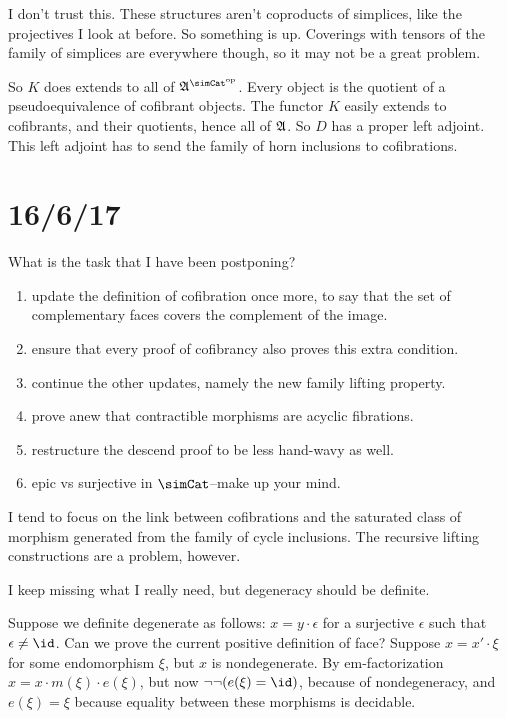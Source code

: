 \documentclass[csh.tex]{subfiles}
\begin{document}
I don't trust this. These structures aren't coproducts of simplices, like the projectives I look at before. So something is up.
Coverings with tensors of the family of simplices are everywhere though, so it may not be a great problem.

So $K$ does extends to all of $\ambient\s$. Every object is the quotient of a pseudoequivalence of cofibrant objects. The functor $K$ easily extends to cofibrants, and their quotients, hence all of $\mathfrak A$. So $D$ has a proper left adjoint. This left adjoint has to send the family of horn inclusions to cofibrations.



\section{16/6/17}
What is the task that I have been postponing?
\begin{enumerate}
\item update the definition of cofibration once more, to say that the set of complementary faces covers the complement of the image.
\item ensure that every proof of cofibrancy also proves this extra condition.
\item continue the other updates, namely the new family lifting property.
\item prove anew that contractible morphisms are acyclic fibrations.
\item restructure the descend proof to be less hand-wavy as well.
\item epic vs surjective in $\simCat$--make up your mind.
\end{enumerate}

I tend to focus on the link between cofibrations and the saturated class of morphism generated from the family of cycle inclusions.
The recursive lifting constructions are a problem, however.

I keep missing what I really need, but degeneracy should be definite.

Suppose we definite degenerate as follows: $x=y\cdot\epsilon$ for a surjective $\epsilon$ such that $\epsilon\neq\id$.
Can we prove the current positive definition of face?
Suppose $x=x'\cdot\xi$ for some endomorphism $\xi$, but $x$ is nondegenerate. By em-factorization $x = x \cdot m(\xi)\cdot e(\xi)$, but now $\neg\neg(e(\xi)=\id)$, because of nondegeneracy, and $e(\xi) = \xi$ because equality between these morphisms is decidable.
\end{document}

